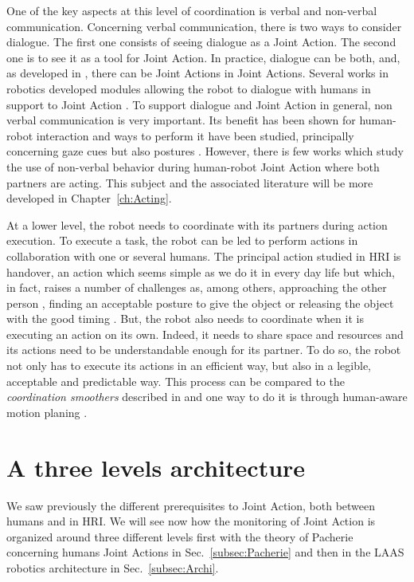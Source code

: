 \documentclass[english,a4paper,11pt,twoside]{StyleThese}
\begin{document}
One of the key aspects at this level of coordination is verbal and non-verbal communication. Concerning verbal communication, there is two ways to consider dialogue. The first one consists of seeing dialogue as a Joint Action. The second one is to see it as a tool for Joint Action. In practice, dialogue can be both, and, as developed in \cite{clark1996using}, there can be Joint Actions in Joint Actions. Several works in robotics developed modules allowing the robot to dialogue with humans in support to Joint Action \cite{roy2000spoken, lucignano2013dialogue, ferreira2015users}. To support dialogue and Joint Action in general, non verbal communication is very important. Its benefit has been shown for human-robot interaction \cite{breazeal2005effects} and ways to perform it have been studied, principally concerning gaze cues \cite{boucher2010facilitative, mutlu2009footing} but also postures \cite{hart2014gesture}. However, there is few works which study the use of non-verbal behavior during human-robot Joint Action where both partners are acting. This subject and the associated literature will be more developed in Chapter~\ref{ch:Acting}.

At a lower level, the robot needs to coordinate with its partners during action execution. To execute a task, the robot can be led to perform actions in collaboration with one or several humans. The principal action studied in HRI is handover, an action which seems simple as we do it in every day life but which, in fact, raises a number of challenges as, among others, approaching the other person \cite{walters2007robotic}, finding an acceptable posture to give the object \cite{cakmak2011human, mainprice2012sharing} or releasing the object with the good timing \cite{mason2005grip}. But, the robot also needs to coordinate when it is executing an action on its own. Indeed, it needs to share space and resources and its actions need to be understandable enough for its partner. To do so, the robot not only has to execute its actions in an efficient way, but also in a legible, acceptable and predictable way. This process can be compared to the \textit{coordination smoothers} described in \cite{vesper2010minimal} and one way to do it is through human-aware motion planing \cite{sisbot2012human, kruse2013human}.


\section{A three levels architecture}

We saw previously the different prerequisites to Joint Action, both between humans and in HRI. We will see now how the monitoring of Joint Action is organized around three different levels first with the theory of Pacherie concerning humans Joint Actions in Sec.~\ref{subsec:Pacherie} and then in the LAAS robotics architecture in Sec.~\ref{subsec:Archi}.
\end{document}
